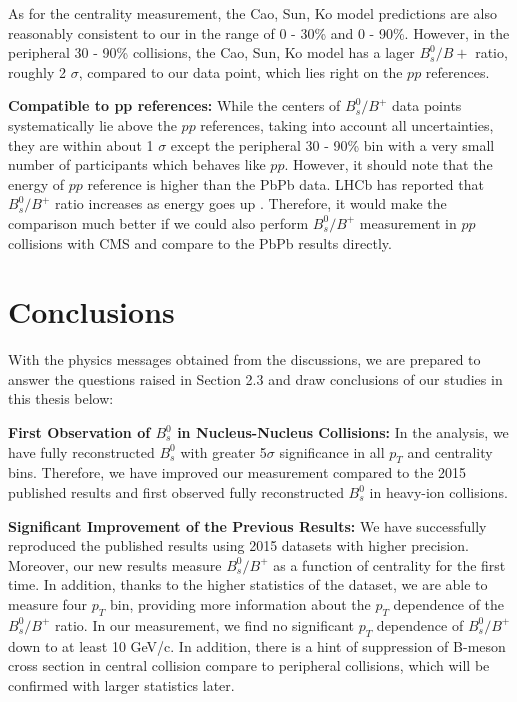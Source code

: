 As for the centrality measurement, the Cao, Sun, Ko model predictions are also reasonably consistent to our in the range of 0 - 30\% and 0 - 90\%. However, in the peripheral 30 - 90\% collisions, the Cao, Sun, Ko model has a lager $B^0_s/B+$ ratio, roughly 2 $\sigma$, compared to our data point, which lies right on the $pp$ references.  


\textbf{Compatible to pp references:} While the centers of $B^0_s/B^+$ data points systematically lie above the $pp$ references, taking into account all uncertainties, they are within about 1 $\sigma$ except the peripheral 30 - 90\% bin with a very small number of participants which behaves like $pp$. However, it should note that the energy of $pp$ reference is higher than the PbPb data. LHCb has reported that $B^0_s/B^+$ ratio increases as energy goes up \cite{LHCbFF}. Therefore, it would make the comparison much better if we could also perform $B^0_s/B^+$ measurement in $pp$ collisions with CMS and compare to the PbPb results directly.



\section{Conclusions}


With the physics messages obtained from the discussions, we are prepared to answer the questions raised in Section 2.3 and draw conclusions of our studies in this thesis below:



\textbf{First Observation of $B^0_s$ in Nucleus-Nucleus Collisions:} In the analysis, we have fully reconstructed $B^0_s$ with greater 5$\sigma$ significance in all $p_T$ and centrality bins. Therefore, we have improved our measurement compared to the 2015 published results and first observed fully reconstructed $B^0_s$ in heavy-ion collisions.

\textbf{Significant Improvement of the Previous Results:} We have successfully reproduced the published results using 2015 datasets with higher precision. Moreover, our new results measure $B^0_s/B^+$ as a function of centrality for the first time. In addition, thanks to the higher statistics of the dataset, we are able to measure four $p_T$ bin, providing more information about the $p_T$ dependence of the $B^0_s/B^+$ ratio. In our measurement, we find no significant $p_T$ dependence of $B^0_s/B^+$ down to at least 10 GeV/c. In addition, there is a hint of suppression of B-meson cross section in central collision compare to peripheral collisions, which will be confirmed with larger statistics later. 
 
